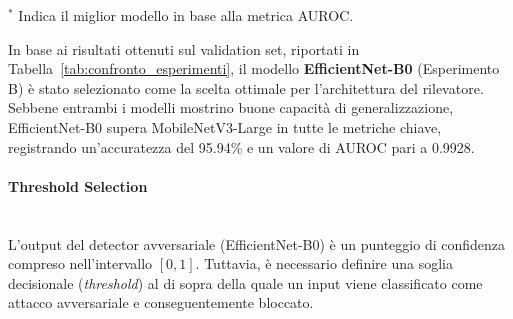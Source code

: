 \documentclass[a4paper, 12pt]{article}
\begin{document}
\begin{table}[H]
    \centering
    \caption{Confronto delle performance di validation tra i modelli MobileNetV3-Large (Esperimento A) ed EfficientNet-B0 (Esperimento B).}
    \label{tab:confronto_esperimenti}
    \begin{flushleft}
        \small $^*$ Indica il miglior modello in base alla metrica AUROC.
    \end{flushleft}
\end{table}

In base ai risultati ottenuti sul validation set, riportati in Tabella~\ref{tab:confronto_esperimenti}, 
il modello \textbf{EfficientNet-B0} (Esperimento B) è stato selezionato come la scelta ottimale per l'architettura 
del rilevatore. Sebbene entrambi i modelli mostrino buone capacità di generalizzazione, EfficientNet-B0 supera 
MobileNetV3-Large in tutte le metriche chiave, registrando un'accuratezza del 95.94\% e un valore di AUROC pari a 0.9928. 

\vspace{10pt} 


\paragraph{Threshold Selection}\mbox{}\\

L'output del detector avversariale (EfficientNet-B0) è un punteggio di confidenza compreso nell'intervallo $[0, 1]$. 
Tuttavia, è necessario definire una soglia decisionale (\textit{threshold}) al di sopra della quale un input viene classificato come
attacco avversariale e conseguentemente bloccato.
\end{document}

